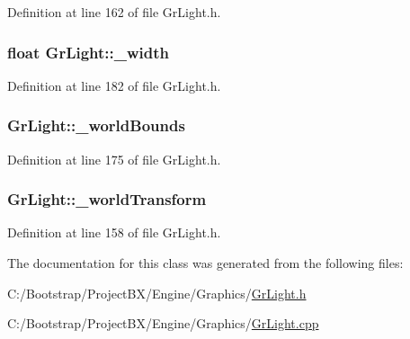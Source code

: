 Definition at line 162 of file GrLight.h.\hypertarget{class_gr_light_b80ea703a480e16f78ab3020983f4630}{
\subsubsection[{\_\-width}]{\setlength{\rightskip}{0pt plus 5cm}float {\bf GrLight::\_\-width}}}
\label{class_gr_light_b80ea703a480e16f78ab3020983f4630}




Definition at line 182 of file GrLight.h.\hypertarget{class_gr_light_d6fc31fefe05cf233361472e01aa0964}{
\subsubsection[{\_\-worldBounds}]{ {\bf GrLight::\_\-worldBounds}}}
\label{class_gr_light_d6fc31fefe05cf233361472e01aa0964}




Definition at line 175 of file GrLight.h.\hypertarget{class_gr_light_d5e7b0c00eb9f66d62bc5a45d0c4bbd1}{
\subsubsection[{\_\-worldTransform}]{ {\bf GrLight::\_\-worldTransform}}}
\label{class_gr_light_d5e7b0c00eb9f66d62bc5a45d0c4bbd1}




Definition at line 158 of file GrLight.h.

The documentation for this class was generated from the following files:\begin{CompactItemize}
\item 
C:/Bootstrap/ProjectBX/Engine/Graphics/\hyperlink{_gr_light_8h}{GrLight.h}\item 
C:/Bootstrap/ProjectBX/Engine/Graphics/\hyperlink{_gr_light_8cpp}{GrLight.cpp}\end{CompactItemize}
